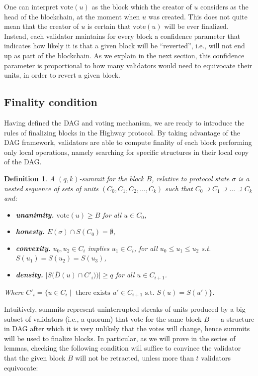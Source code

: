 \documentclass[12pt, fleqn]{article}
\newtheorem{definition}{Definition}
\newcommand{\vote}{\mathrm{vote}}
\begin{document}
One can interpret $\vote(u)$ as the block which the creator of $u$ considers as the head of the blockchain, at the moment when $u$ was created.
%
This does not quite mean that the creator of $u$ is certain that $\vote(u)$ will be ever finalized.
%
Instead, each validator maintains for every block a confidence parameter that indicates how likely it is that a given block will be ``reverted'', i.e., will not end up as part of the blockchain.
%
As we explain in the next section, this confidence parameter is proportional to how many validators would need to equivocate their units, in order to revert a given block.


\subsection{Finality condition}\label{sec:finality}

Having defined the DAG and voting mechanism, we are ready to introduce the rules of finalizing blocks in the Highway protocol.
By taking advantage of the DAG framework, validators are able to compute finality of each block performing only local operations, namely searching for specific structures in their local copy of the DAG. 


\begin{definition}
A $(q,k)$-summit for the block $B$, relative to protocol state $\sigma$ is a nested sequence of sets of units $(C_0, C_1, C_2, \dots, C_k)$ such that $C_0\supseteq C_1 \supseteq \ldots \supseteq C_k$ and:

\begin{itemize}
  \item {\bf unanimity.} $\vote(u) \geq B$ for all $u\in C_0$,
  \item {\bf honesty.} $E(\sigma) \cap S(C_0) = \emptyset$,
  \item {\bf convexity.} $u_0, u_2 \in C_i$ implies $u_1 \in C_i$, for all $u_0  \leq u_1 \leq u_2$ s.t. $S(u_1) = S(u_2) = S(u_3)$,
  \item {\bf density.} $\big|S\big(\bar{D}(u) \cap C'_i)\big)\big| \geq q$ for all $u \in C_{i + 1}$.
\end{itemize}
Where $C'_i = \big\{u\in C_i \mid \text{ there exists } u'\in C_{i+1} \text{ s.t. } S(u) = S(u') \big\}$.
\end{definition}

Intuitively, summits represent uninterrupted streaks of units produced by a big subset of validators (i.e., a quorum) that vote for the same block $B$ --- a structure in DAG after which it is very unlikely that the votes will change, hence summits will be used to finalize blocks.
In particular, as we will prove in the series of lemmas, checking the following condition will suffice to convince the validator that the given block $B$ will not be retracted, unless more than $t$ validators equivocate:
\end{document}
